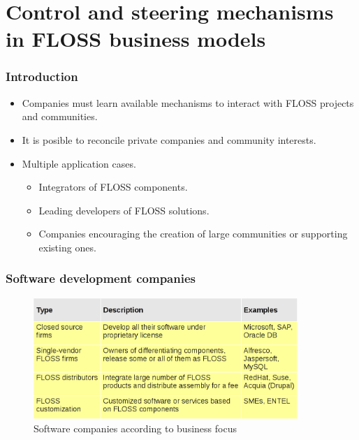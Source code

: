
\section{Control and steering mechanisms in FLOSS business models}

\begin{frame}
\frametitle{Introduction}
\begin{itemize}
  \item Companies must learn available mechanisms to interact with FLOSS projects and communities.
  \item It is posible to reconcile private companies and community interests.
  \item Multiple application cases.
    \begin{itemize}
     \item Integrators of FLOSS components.
     \item Leading developers of FLOSS solutions.
     \item Companies encouraging the creation of large communities or supporting existing ones.
    \end{itemize}
\end{itemize}
\end{frame}


\begin{frame}
\frametitle{Software development companies}

\begin{center}
  \begin{figure}
    \includegraphics[width=10cm]{figs/sw-development-companies.png}
    \caption{Software companies according to business focus} 
  \end{figure}
\end{center}

\end{frame}


